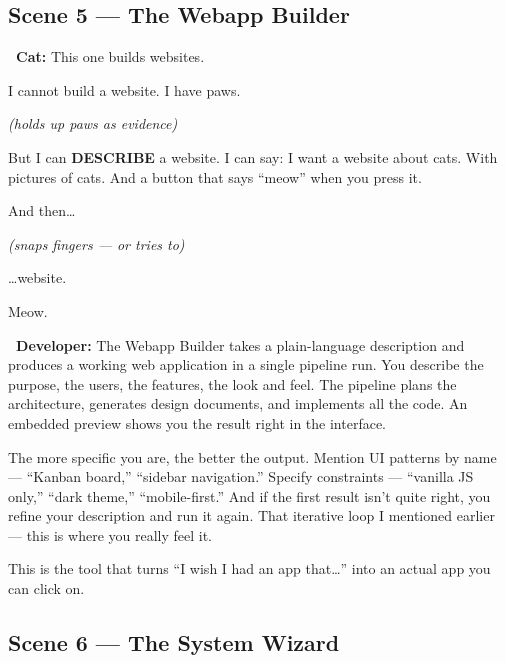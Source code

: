 \documentclass[12pt, letterpaper]{article}
\newcommand{\dev}{\textbf{\color{cogblue}\faIcon{laptop-code}\ Developer:}}
\newcommand{\cat}{\textbf{\color{catpink}\faIcon{cat}\ Cat:}}
\begin{document}
  \subsection{Scene 5 — The Webapp Builder}

  \begin{catbox}
    \cat{} \large This one builds websites.

    \medskip
    {\large I cannot build a website. I have paws.}

    \medskip
    {\large\textit{(holds up paws as evidence)}}

    \medskip
    {\large But I can \textbf{DESCRIBE} a website. I can say: I want a website
    about cats. With pictures of cats. And a button that says ``meow'' when you
    press it.}

    \medskip
    {\large And then\ldots}

    \medskip
    {\large\textit{(snaps fingers — or tries to)}}

    \medskip
    {\large \ldots website.}

    \medskip
    {\large Meow.}
  \end{catbox}

  \begin{developerbox}
    \dev{} The Webapp Builder takes a plain-language description and produces a
    working web application in a single pipeline run. You describe the purpose, the
    users, the features, the look and feel. The pipeline plans the architecture,
    generates design documents, and implements all the code. An embedded preview
    shows you the result right in the interface.

    \medskip
    The more specific you are, the better the output. Mention UI patterns by name —
    ``Kanban board,'' ``sidebar navigation.'' Specify constraints — ``vanilla JS
    only,'' ``dark theme,'' ``mobile-first.'' And if the first result isn't quite
    right, you refine your description and run it again. That iterative loop I
    mentioned earlier — this is where you really feel it.

    \medskip
    This is the tool that turns ``I wish I had an app that\ldots'' into an actual
    app you can click on.
  \end{developerbox}

  \subsection{Scene 6 — The System Wizard}
\end{document}
